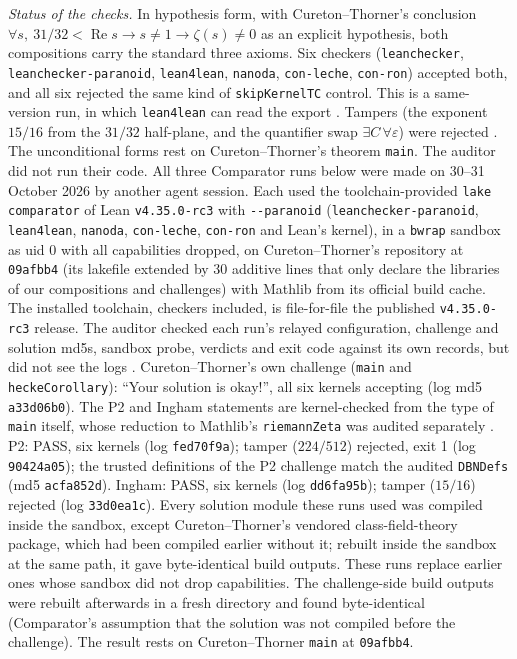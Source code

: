 \documentclass[11pt]{article}
\theoremstyle{definition}
\newcommand{\lean}[1]{\texttt{#1}}
\newcommand{\re}{\operatorname{Re}}
\begin{document}
\emph{Status of the checks.} In hypothesis form, with Cureton--Thorner's conclusion $\forall s,\ 31/32 < \re s \to s \ne 1 \to \zeta(s) \ne 0$ as an explicit hypothesis, both compositions carry the standard three axioms. Six checkers (\lean{leanchecker}, \lean{leanchecker-paranoid}, \lean{lean4lean}, \lean{nanoda}, \lean{con-leche}, \lean{con-ron}) accepted both, and all six rejected the same kind of \lean{skipKernelTC} control. This is a same-version run, in which \lean{lean4lean} can read the export \cite[REVIEW\_CTFREE\_KERNELS]{bbrecords}. Tampers (the exponent $15/16$ from the $31/32$ half-plane, and the quantifier swap $\exists C\,\forall\varepsilon$) were rejected \cite[REVIEW\_INGHAM]{bbrecords}. The unconditional forms rest on Cureton--Thorner's theorem \lean{main}. The auditor did not run their code. All three Comparator runs below were made on 30--31 October 2026 by another agent session. Each used the toolchain-provided \lean{lake comparator} of Lean \lean{v4.35.0-rc3} with \lean{-{}-paranoid} (\lean{leanchecker-paranoid}, \lean{lean4lean}, \lean{nanoda}, \lean{con-leche}, \lean{con-ron} and Lean's kernel), in a \lean{bwrap} sandbox as uid 0 with all capabilities dropped, on Cureton--Thorner's repository at \lean{09afbb4} (its lakefile extended by 30 additive lines that only declare the libraries of our compositions and challenges) with Mathlib from its official build cache. The installed toolchain, checkers included, is file-for-file the published \lean{v4.35.0-rc3} release. The auditor checked each run's relayed configuration, challenge and solution md5s, sandbox probe, verdicts and exit code against its own records, but did not see the logs \cite[REVIEW\_CT\_RERUNS]{bbrecords}. Cureton--Thorner's own challenge (\lean{main} and \lean{heckeCorollary}): ``Your solution is okay!'', all six kernels accepting (log md5 \lean{a33d06b0}). The P2 and Ingham statements are kernel-checked from the type of \lean{main} itself, whose reduction to Mathlib's \lean{riemannZeta} was audited separately \cite[REVIEW\_CTQ, Addendum~1]{bbrecords}. P2: PASS, six kernels (log \lean{fed70f9a}); tamper ($224/512$) rejected, exit 1 (log \lean{90424a05}); the trusted definitions of the P2 challenge match the audited \lean{DBNDefs} (md5 \lean{acfa852d}). Ingham: PASS, six kernels (log \lean{dd6fa95b}); tamper ($15/16$) rejected (log \lean{33d0ea1c}). Every solution module these runs used was compiled inside the sandbox, except Cureton--Thorner's vendored class-field-theory package, which had been compiled earlier without it; rebuilt inside the sandbox at the same path, it gave byte-identical build outputs. These runs replace earlier ones whose sandbox did not drop capabilities. The challenge-side build outputs were rebuilt afterwards in a fresh directory and found byte-identical (Comparator's assumption that the solution was not compiled before the challenge). The result rests on Cureton--Thorner \lean{main} at \lean{09afbb4}.
\end{document}
